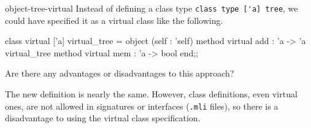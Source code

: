 \begin{exercise}{object-tree-virtual}
Instead of defining a class type \hbox{\lstinline$class type ['a] tree$},
we could have specified it as a virtual class like the following.

\begin{ocaml}
class virtual ['a] virtual_tree =
  object (self : 'self)
    method virtual add : 'a -> 'a virtual_tree
    method virtual mem : 'a -> bool
  end;;
\end{ocaml}
%
Are there any advantages or disadvantages to this approach?

\begin{answer}\ifanswers
The new definition is nearly the same.  However, class definitions,
even virtual ones, are not allowed in signatures or interfaces
(\hbox{\lstinline$.mli$} files), so there is a disadvantage to using the
virtual class specification.
\fi\end{answer}
\end{exercise}


